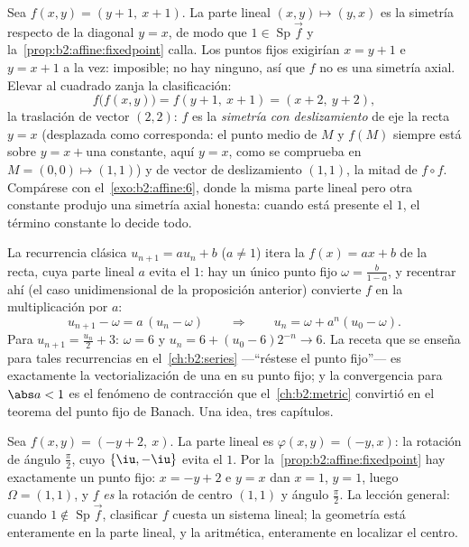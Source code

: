 \begin{example}\label{ex:b2:affine:glide}
Sea $f(x, y) = (y + 1,\ x + 1)$. La parte lineal $(x, y) \mapsto (y,
x)$ es la simetría respecto de la diagonal $y = x$, de modo que $1
\in \operatorname{Sp}\vec f$ y la~\cref{prop:b2:affine:fixedpoint} calla. Los puntos fijos exigirían $x
= y + 1$ e $y = x + 1$ a la vez: imposible; no hay ninguno, así que
$f$ no es una simetría axial. Elevar al cuadrado zanja la
clasificación:
\[
f\bigl(f(x, y)\bigr) = f(y + 1,\ x + 1) = (x + 2,\ y + 2),
\]
la traslación de vector $(2, 2)$: $f$ es la \emph{simetría con
deslizamiento} de eje la recta $y = x$ (desplazada como corresponda:
el punto medio de $M$ y $f(M)$ siempre está sobre $y = x + {}$una
constante, aquí $y = x$, como se comprueba en $M = (0, 0) \mapsto
(1,1)$) y de vector de deslizamiento $(1, 1)$, la mitad de $f \circ
f$. Compárese con el~\cref{exo:b2:affine:6}, donde la misma parte
lineal pero otra constante produjo una simetría axial honesta: cuando
está presente el  $1$, el término constante lo decide
todo.
\end{example}

\begin{example}\label{ex:b2:affine:recursion}
La recurrencia clásica $u_{n+1} = au_n + b$ ($a \neq 1$) itera la
 $f(x) = ax + b$ de la recta, cuya parte lineal $a$
evita el  $1$: hay un único punto fijo $\omega =
\frac{b}{1-a}$, y recentrar ahí (el caso unidimensional de la
proposición anterior) convierte $f$ en la multiplicación por $a$:
\[
u_{n+1} - \omega = a\,(u_n - \omega)
\qquad\Longrightarrow\qquad
u_n = \omega + a^n(u_0 - \omega) .
\]
Para $u_{n+1} = \frac{u_n}2 + 3$: $\omega = 6$ y $u_n = 6 + (u_0 -
6)2^{-n} \to 6$. La receta que se enseña para tales recurrencias en
el~\cref{ch:b2:series} ---``réstese el punto fijo''--- es exactamente
la vectorialización de una  en su punto fijo; y la
convergencia para $\abs a < 1$ es el fenómeno de contracción que el~\cref{ch:b2:metric} convirtió en el teorema del punto fijo de Banach.
Una idea, tres capítulos.
\end{example}

\begin{example}\label{ex:b2:affine:rotationcenter}
Sea $f(x, y) = (-y + 2,\ x)$. La parte lineal es $\varphi(x, y) =
(-y, x)$: la rotación de ángulo $\frac\pi2$, cuyo  $\{\iu,
-\iu\}$ evita el $1$. Por la~\cref{prop:b2:affine:fixedpoint} hay
exactamente un punto fijo: $x = -y + 2$ e $y = x$ dan $x = 1$, $y =
1$, luego $\Omega = (1, 1)$, y $f$ \emph{es} la rotación de centro
$(1, 1)$ y ángulo $\frac\pi2$. La lección general: cuando $1 \notin
\operatorname{Sp}\vec f$, clasificar $f$ cuesta un sistema lineal; la
geometría está enteramente en la parte lineal, y la aritmética,
enteramente en localizar el centro.
\end{example}

